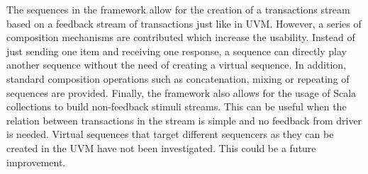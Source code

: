 The sequences in the framework allow for the creation of a transactions stream based on a feedback stream of transactions just like in UVM. However, a series of composition mechanisms are contributed which increase the usability. Instead of just sending one item and receiving one response, a sequence can directly play another sequence without the need of creating a virtual sequence. In addition, standard composition operations such as concatenation, mixing or repeating of sequences are provided. Finally, the framework also allows for the usage of Scala collections to build non-feedback stimuli streams. This can be useful when the relation between transactions in the stream is simple and no feedback from driver is needed. Virtual sequences that target different sequencers as they can be created in the UVM have not been investigated. This could be a future improvement.




